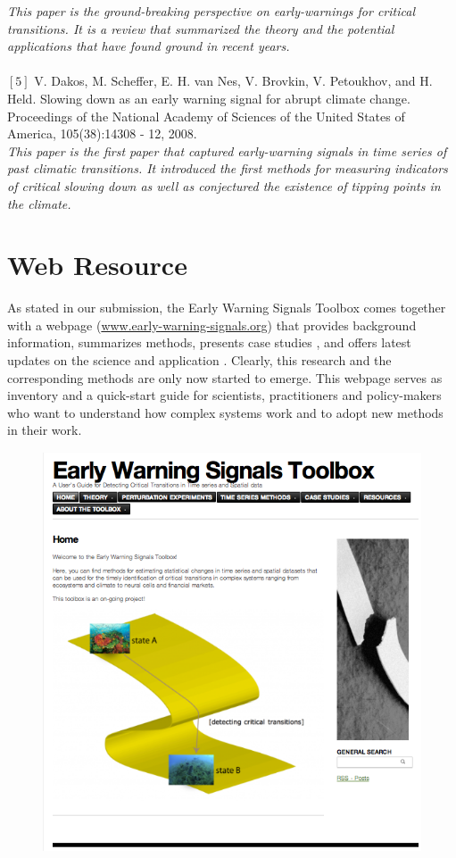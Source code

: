 \documentclass[12pt,a4paper,final]{article}
\begin{document}
\begin{doublespacing}
\textit{This paper is the ground-breaking perspective on early-warnings for critical transitions. It is a review that summarized the theory and the potential applications that have found ground in recent years.}\\
\\
$[5]$ V. Dakos, M. Scheffer, E. H. van Nes, V. Brovkin, V. Petoukhov, and H. Held. Slowing down as an early warning signal for abrupt climate change. Proceedings of the National Academy
of Sciences of the United States of America, 105(38):14308 - 12, 2008.\\
\textit{This paper is the first paper that captured early-warning signals in time series of past climatic transitions. It introduced the first methods for measuring indicators of critical slowing down as well as conjectured the existence of tipping points in the climate.}

\newpage
\section{Web Resource}
As stated in our submission, the Early Warning Signals Toolbox comes together with a webpage (\url{www.early-warning-signals.org}) that provides background information, summarizes methods, presents case studies%
, and offers latest updates on the science and application%
. Clearly, this research and the corresponding methods are only now started to emerge. This webpage serves as inventory and a quick-start guide for scientists, practitioners and policy-makers who want to understand how complex systems work and to adopt new methods in their work.

\begin{figure}[ht]
\includegraphics[scale=0.8]{webpage_ews_home.png}
\end{figure}

\end{doublespacing}
\end{document}
